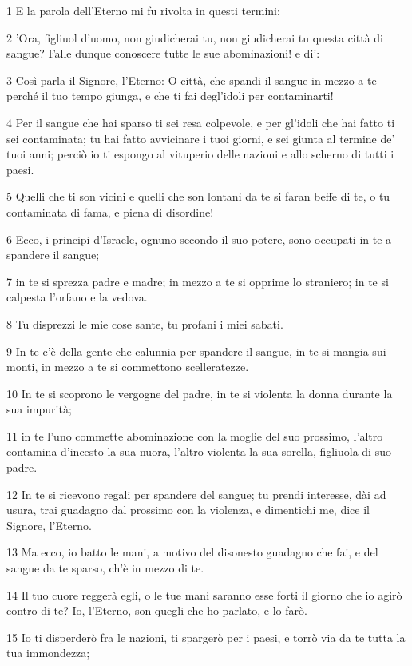 \par 1 E la parola dell'Eterno mi fu rivolta in questi termini:
\par 2 'Ora, figliuol d'uomo, non giudicherai tu, non giudicherai tu questa città di sangue? Falle dunque conoscere tutte le sue abominazioni! e di':
\par 3 Così parla il Signore, l'Eterno: O città, che spandi il sangue in mezzo a te perché il tuo tempo giunga, e che ti fai degl'idoli per contaminarti!
\par 4 Per il sangue che hai sparso ti sei resa colpevole, e per gl'idoli che hai fatto ti sei contaminata; tu hai fatto avvicinare i tuoi giorni, e sei giunta al termine de' tuoi anni; perciò io ti espongo al vituperio delle nazioni e allo scherno di tutti i paesi.
\par 5 Quelli che ti son vicini e quelli che son lontani da te si faran beffe di te, o tu contaminata di fama, e piena di disordine!
\par 6 Ecco, i principi d'Israele, ognuno secondo il suo potere, sono occupati in te a spandere il sangue;
\par 7 in te si sprezza padre e madre; in mezzo a te si opprime lo straniero; in te si calpesta l'orfano e la vedova.
\par 8 Tu disprezzi le mie cose sante, tu profani i miei sabati.
\par 9 In te c'è della gente che calunnia per spandere il sangue, in te si mangia sui monti, in mezzo a te si commettono scelleratezze.
\par 10 In te si scoprono le vergogne del padre, in te si violenta la donna durante la sua impurità;
\par 11 in te l'uno commette abominazione con la moglie del suo prossimo, l'altro contamina d'incesto la sua nuora, l'altro violenta la sua sorella, figliuola di suo padre.
\par 12 In te si ricevono regali per spandere del sangue; tu prendi interesse, dài ad usura, trai guadagno dal prossimo con la violenza, e dimentichi me, dice il Signore, l'Eterno.
\par 13 Ma ecco, io batto le mani, a motivo del disonesto guadagno che fai, e del sangue da te sparso, ch'è in mezzo di te.
\par 14 Il tuo cuore reggerà egli, o le tue mani saranno esse forti il giorno che io agirò contro di te? Io, l'Eterno, son quegli che ho parlato, e lo farò.
\par 15 Io ti disperderò fra le nazioni, ti spargerò per i paesi, e torrò via da te tutta la tua immondezza;
